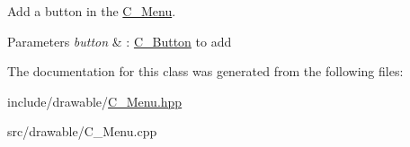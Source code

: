 Add a button in the \hyperlink{classMenu}{C_Menu}.


\begin{DoxyParams}{Parameters}
{\em button} & \+: \hyperlink{classButton}{C_Button} to add \\
\hline
\end{DoxyParams}


The documentation for this class was generated from the following files\+:\begin{DoxyCompactItemize}
\item 
include/drawable/\hyperlink{Menu_8hpp}{C_Menu.\+hpp}\item
src/drawable/C_Menu.\+cpp\end{DoxyCompactItemize}
